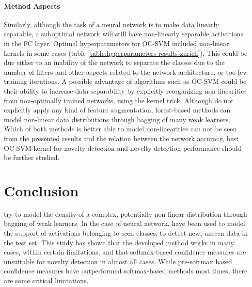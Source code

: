 \documentclass[10pt]{article}
\begin{document}
\paragraph{Method Aspects} Similarly, although the task of a neural network is to make data linearly separable, a suboptimal network will still have non-linearly separable activations in the \gls{FC} layer. Optimal hyperparameters for \gls{OC-SVM} included non-linear kernels in some cases (table \ref{table:hyperparameters-results-zurich}). This could be due either to an inability of the network to separate the classes due to the number of filters and other aspects related to the network architecture, or too few training iterations. A possible advantage of algorithms such as \gls{OC-SVM} could be their ability to increase data separability by explicitly reorganizing non-linearities from non-optimally trained networks, using the kernel trick. Although  do not explicitly apply any kind of feature augmentation, forest-based methods can model non-linear data distributions through bagging of many weak learners. Which of both methods is better able to model non-linearities can not be seen from the presented results and the relation between the network accuracy, best \gls{OC-SVM} kernel for novelty detection and novelty detection performance should be further studied.

\section{Conclusion}
 try to model the density of a complex, potentially non-linear distribution through bagging of weak learners. In the case of neural network,  have been used to model the support of activations belonging to seen classes, to detect new, unseen data in the test set. This study has shown that the developed method works in many cases, within certain limitations, and that softmax-based confidence measures are unsuitable for novelty detection in almost all cases. While pre-softmax based confidence measures have outperformed softmax-based methods most times, there are some critical limitations.
\end{document}
